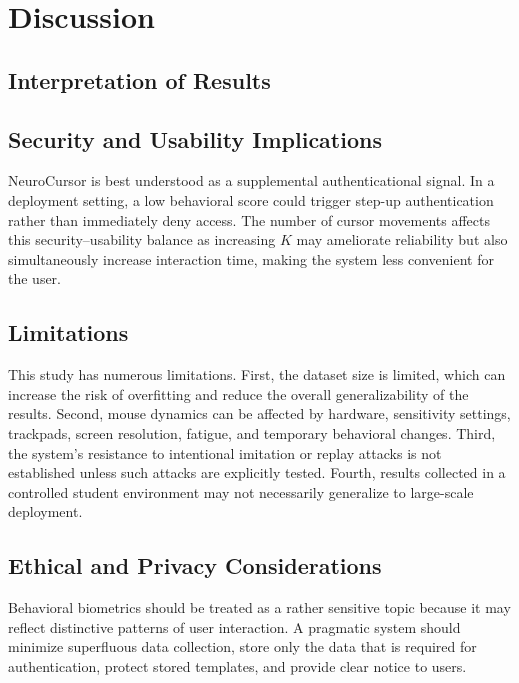 \documentclass[conference]{IEEEtran}
\begin{document}
\section{Discussion}

\subsection{Interpretation of Results}


\subsection{Security and Usability Implications}

NeuroCursor is best understood as a supplemental authenticational signal. In a deployment setting, a low behavioral score could trigger step-up authentication rather than immediately deny access. The number of cursor movements affects this security--usability balance as increasing $K$ may ameliorate reliability but also simultaneously increase interaction time, making the system less convenient for the user. 

\subsection{Limitations}

This study has numerous limitations. First, the dataset size is limited, which can increase the risk of overfitting and reduce the overall generalizability of the results. Second, mouse dynamics can be affected by hardware, sensitivity settings, trackpads, screen resolution, fatigue, and temporary behavioral changes. Third, the system's resistance to intentional imitation or replay attacks is not established unless such attacks are explicitly tested. Fourth, results collected in a controlled student environment may not necessarily generalize to large-scale deployment. 

\subsection{Ethical and Privacy Considerations}

Behavioral biometrics should be treated as a rather sensitive topic because it may reflect distinctive patterns of user interaction. A pragmatic system should minimize superfluous data collection, store only the data that is required for authentication, protect stored templates, and provide clear notice to users. 
\end{document}
